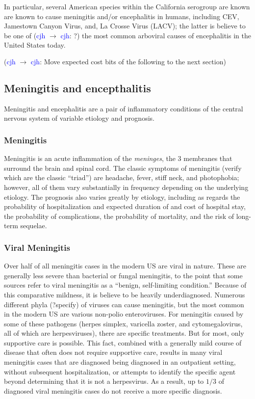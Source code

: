 \documentclass[12pt]{article}
\newcommand{\cjh}{\textcolor{blue}{cjh}}
\newcommand{\msg}[3]{(#1 $\rightarrow$ #2: #3)}
\newcommand{\mcc}[1]{\msg\cjh\cjh{#1}}
\begin{document}
        In particular, several American species within the California serogroup are known are known to cause meningitis and/or encephalitis in humans, including CEV, Jamestown Canyon Virus, and, La Crosse Virus (LACV); the latter is believe to be one of \mcc{?} the most common arboviral causes of encephalitis in the United States today.


        \mcc{Move expected cost bits of the following to the next section}
        \subsection{Meningitis and encepthalitis}
            Meningitis and encephalitis are a pair of inflammatory conditions of the central nervous system of variable etiology and prognosis.
            
            \subsubsection{Meningitis}
            Meningitis is an acute inflammation of the \textit{meninges}, the 3 membranes that surround the brain and spinal cord. The classic symptoms of meningitis (verify which are the classic ``triad'') are headache, fever, stiff neck, and photophobia; however, all of them vary substantially in frequency depending on the underlying etiology. The prognosis also varies greatly by etiology, including as regards the probability of hospitalization and expected duration of and cost of hospital stay, the probability of complications, the probability of mortality, and the risk of long-term sequelae.

        \subsubsection{Viral Meningitis}
            Over half of all meningitis cases in the modern US are viral in nature. These are generally less severe than bacterial or fungal meningitis, to the point that some sources refer to viral meningitis as a ``benign, self-limiting condition.''\cite{asdf} Because of this comparative mildness, it is believe to be heavily underdiagnosed. Numerous different phyla (?specify) of viruses can cause meningitis, but the most common in the modern US are various non-polio enteroviruses. For meningitis caused by some of these pathogens (herpes simplex, varicella zoster, and cytomegalovirus, all of which are herpesviruses), there are specific treatments. But for most, only supportive care is possible. This fact, combined with a generally mild course of disease that often does not require supportive care, results in many viral meningitis cases that are diagnosed being diagnosed in an outpatient setting, without subsequent hospitalization, or attempts to identify the specific agent beyond determining that it is not a herpesvirus. As a result, up to $1/3$ of diagnosed viral meningitis cases do not receive a more specific diagnosis.
\end{document}
